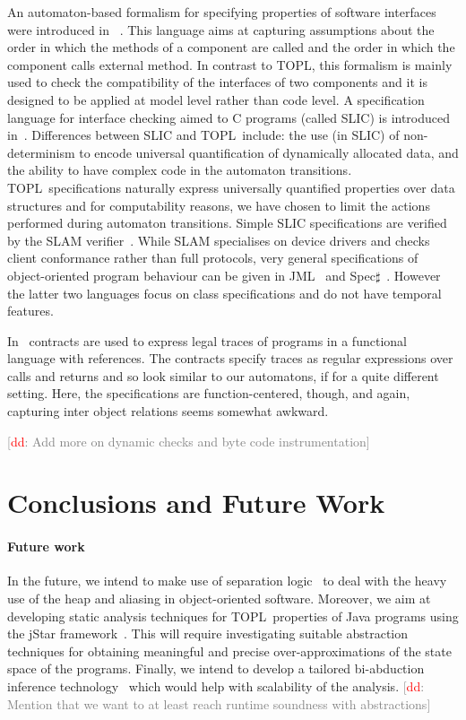 \documentclass[10pt]{llncs} %
\newcommand{\TPL}{TOPL}
\newcommand{\noterg}[2]{\textcolor{gray}{[\textcolor{red}{#1}: #2]}}
\newcommand{\dd}[1]{\noterg{dd}{#1}}
\newcommand{\dinocomment}[1]{\dd{#1}}
\begin{document}
An automaton-based formalism for specifying properties of software interfaces were introduced in~\cite{dblp:conf/sigsoft/AlfaroH01} . 
This language aims at capturing assumptions about the order in which the methods of a component are called and the order in which the component calls external method.
In contrast to \TPL, this formalism is mainly used to check the compatibility of the interfaces of two components and it is designed to be applied at  model level rather than code level. A specification language for interface checking aimed to C programs (called SLIC) is introduced in~\cite{ball2002}.  
Differences between SLIC and \TPL \ include: the use (in SLIC) of
non-determinism to encode universal quantification of dynamically allocated data, and the  ability to have complex code in the automaton transitions. 
\TPL \ specifications naturally express universally quantified
properties over data structures and for computability reasons,  we
have chosen to limit the  actions performed during automaton transitions. 
Simple SLIC specifications are verified by  the SLAM verifier~\cite{dblp:conf/cav/ballr01}.
While SLAM specialises on device drivers and checks client conformance rather than full protocols, 
very general specifications of object-oriented program behaviour can be given in JML~\cite{jml} and Spec$\sharp$~\cite{DBLP:journals/jot/BarnettDFLS04}. However the latter two languages focus on class specifications and do not have temporal features.

In~\cite{disney2011} contracts are used to express legal traces of
programs in a functional language with references. The contracts
specify traces as regular expressions over calls and returns and so
look similar to our automatons, if for a quite different
setting. Here, the specifications are function-centered, though, and
again, capturing inter object relations seems somewhat awkward.

\dinocomment{Add more on dynamic checks and byte code instrumentation}

\section{Conclusions and Future Work}\label{sec:conclusions} %

\paragraph{Future work}
In the future, we intend to make use of separation logic~\cite{reynolds2002} to deal with the heavy use of the heap and aliasing in object-oriented software. Moreover, we aim at developing static analysis techniques for \TPL \ properties of Java programs using the jStar framework~\cite{DBLP:conf/oopsla/DistefanoP08}.
This will require investigating suitable abstraction techniques for obtaining meaningful and precise over-approximations of the state space of the programs.
Finally, we intend to develop a tailored bi-abduction inference technology~\cite{dblp:conf/popl/CalcagnoDOY09} which would help with scalability of the analysis.
\dinocomment{Mention that we want to at least reach runtime soundness with abstractions}





\end{document}
